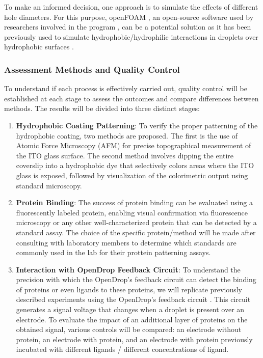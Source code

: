 \documentclass[8pt, twocolumn]{article}
\begin{document}
To make an informed decision, one approach is to simulate the effects of different hole diameters. For this purpose, openFOAM \cite{wellerTensorialApproachComputational1998}, an open-source software used by researchers involved in the program \cite{rogninMultiscaleModelRupture2018}, can be a potential solution as it has been previously used to simulate hydrophobic/hydrophilic interactions in droplets over hydrophobic surfaces \cite{zhaoAnalyzingMolecularKinetics2017}.

\subsubsection*{Assessment Methods and Quality Control}

To understand if each process is effectively carried out, quality control will be established at each stage to assess the outcomes and compare differences between methods. The results will be divided into three distinct stages:

\begin{enumerate}
  \item \textbf{Hydrophobic Coating Patterning}: To verify the proper patterning of the hydrophobic coating, two methods are proposed. The first is the use of Atomic Force Microscopy (AFM) for precise topographical measurement of the ITO glass surface. The second method involves dipping the entire coverslip into a hydrophobic dye that selectively colors areas where the ITO glass is exposed, followed by visualization of the colorimetric output using standard microscopy. 

  \item \textbf{Protein Binding}: The success of protein binding can be evaluated using a fluorescently labeled protein, enabling visual confirmation via fluorescence microscopy or any other well-characterized protein that can be detected by a standard assay. The choice of the specific protein/method will be made after consulting with laboratory members to determine which standards are commonly used in the lab for their prottein patterning assays.

  \item \textbf{Interaction with OpenDrop Feedback Circuit}: To understand the precision with which the OpenDrop's feedback circuit can detect the binding of proteins or even ligands to these proteins, we will replicate previously described experiments using the OpenDrop's feedback circuit \cite{FeedbackAmplifierOpenDrop2016}. This circuit generates a signal voltage that changes when a droplet is present over an electrode. To evaluate the impact of an additional layer of proteins on the obtained signal, various controls will be compared: an electrode without protein, an electrode with protein, and an electrode with protein previously incubated with different ligands / different concentrations of ligand.
  
\end{enumerate}
\end{document}
